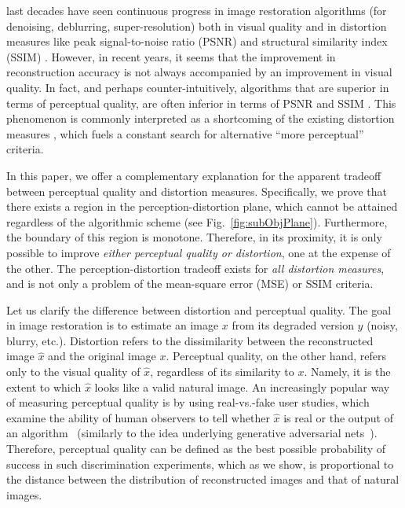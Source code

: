 
 last decades have seen continuous progress in image restoration algorithms (\eg for denoising, deblurring, super-resolution) both in visual quality and in distortion measures like peak signal-to-noise ratio (PSNR) and structural similarity index (SSIM) \cite{wang2004image}. However, in recent years, it seems that the improvement in reconstruction accuracy is not always accompanied by an improvement in visual quality. In fact, and perhaps counter-intuitively, algorithms that are superior in terms of perceptual quality, are often inferior in terms of \eg PSNR and SSIM \cite{ledig2016photo,johnson2016perceptual,dahl2017pixel,sajjadi2017enhancenet,yeh2017semantic,yang2014single,shaham2019singan}. This phenomenon is commonly interpreted as a shortcoming of the existing distortion measures \cite{wang2009mean}, which fuels a constant search for alternative ``more perceptual'' criteria.

In this paper, we offer a complementary explanation for the apparent tradeoff between perceptual quality and distortion measures. Specifically, we prove that there exists a region in the perception-distortion plane, which cannot be attained regardless of the algorithmic scheme (see Fig.~\ref{fig:subObjPlane}). Furthermore, the boundary of this region is monotone. Therefore, in its proximity, it is only possible to improve \emph{either perceptual quality or distortion}, one at the expense of the other. The perception-distortion tradeoff exists for \emph{all distortion measures}, and is not only a problem of the mean-square error (MSE) or SSIM criteria. 

Let us clarify the difference between distortion and perceptual quality. The goal in image restoration is to estimate an image $x$ from its degraded version $y$ (\eg noisy, blurry, etc.). Distortion refers to the dissimilarity between the reconstructed image $\hat{x}$ and the original image $x$. Perceptual quality, on the other hand, refers only to the visual quality of $\hat{x}$, regardless of its similarity to $x$. Namely, it is the extent to which $\hat{x}$ looks like a valid natural image. An increasingly popular way of measuring perceptual quality is by using real-vs.\@-fake user studies, which examine the ability of human observers to tell whether $\hat{x}$ is real or the output of an algorithm~\cite{isola2016image,zhang2016colorful,salimans2016improved,denton2015deep,dahl2017pixel,iizuka2016let,zhang2017real,guadarrama2017pixcolor} (similarly to the idea underlying generative adversarial nets~\cite{goodfellow2014generative}). Therefore, perceptual quality can be defined as the best possible probability of success in such discrimination experiments, which as we show, is proportional to the distance between the distribution of reconstructed images and that of natural images.

